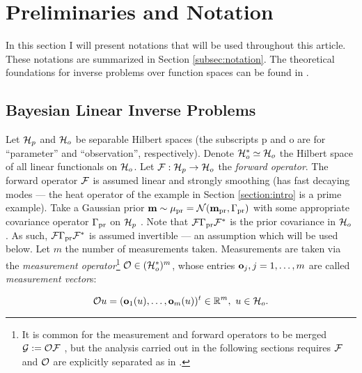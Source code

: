 \section{Preliminaries and Notation}\label{section:prelim}

In this section I will present notations that will be used throughout
this article. These notations are summarized in Section
\ref{subsec:notation}. The theoretical foundations for inverse
problems over function spaces can be found in \cite{Stuart10}.


\subsection{Bayesian Linear Inverse Problems}\label{subsec:abstract OED}
Let $\mathcal{H}_p$ and $\mathcal{H}_o$ be separable Hilbert spaces (the subscripts p
and o are for ``parameter'' and ``observation'', respectively). Denote
$\mathcal{H}_o^* \simeq \mathcal{H}_o$ the Hilbert space of all linear functionals on
$\mathcal{H}_o$. Let $\mathcal{F}: \mathcal{H}_p \to \mathcal{H}_o$ the \emph{forward operator}. The
forward operator $\mathcal{F}$ is assumed linear and strongly smoothing (has
fast decaying modes --- the heat operator of the example in Section
\ref{section:intro} is a prime example). Take a Gaussian prior $\mathbf{m}
\sim \mu_{\textup{pr}} = \mathcal{N}(\mathbf{m}_{\textup{pr}} ,\Gamma_{\textup{pr}})$ with some appropriate covariance
operator $\Gamma_{\textup{pr}}$ on $\mathcal{H}_p$ \cite{Stuart10}. Note that $\mathcal{F} \Gamma_{\textup{pr}}
\mathcal{F}^*$ is the prior covariance in $\mathcal{H}_o$ \cite{Stuart10}. As such,
$\mathcal{F} \Gamma_{\textup{pr}} \mathcal{F}^*$ is assumed invertible --- an assumption which
will be used below. Let $m$ the number of measurements
taken. Measurements are taken via the \emph{measurement
operator}\footnote{It is common for the measurement and forward
operators to be merged $\mathcal{G} := \mathcal{O} \mathcal{F}$
\cite{AlexanderianGloorGhattas14}, but the analysis carried out in the
following sections requires $\mathcal{F}$ and $\mathcal{O}$ are explicitly separated
as in \cite{attia2022stochastic, cvetkovic2023choosing}.} $\mathcal{O} \in (
\mathcal{H}_o^* )^m$, whose entries $\mathbf{o}_j, j=1,\dots,m$ are called
\emph{measurement vector}s:

\begin{equation*}%
  \obs u = (\meas_1(u), \dots, \meas_m(u) )^t \in \R^m,\ u \in \hilo.
\end{equation*}
%
%


